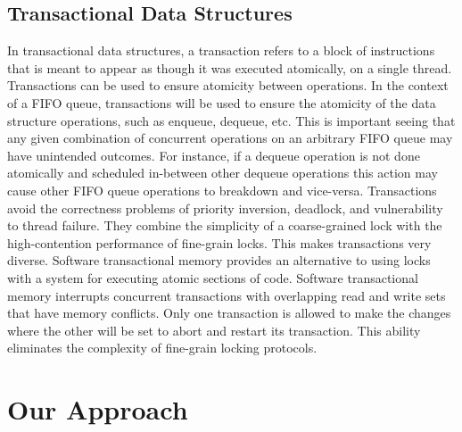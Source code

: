 \documentclass[a4paper, 10pt, conference]{ieeeconf}      %
\begin{document}
\subsection{Transactional Data Structures}
In transactional data structures, a transaction refers to a block of instructions that is meant to appear as though it was executed atomically, on a single thread. Transactions can be used to ensure atomicity between operations. In the context of a FIFO queue, transactions will be used to ensure the atomicity of the data structure operations, such as enqueue, dequeue, etc. This is important seeing that any given combination of concurrent operations on an arbitrary FIFO queue may have unintended outcomes. For instance, if a dequeue operation is not done atomically and scheduled in-between other dequeue operations this action may cause other FIFO queue operations to breakdown and vice-versa. Transactions avoid the correctness problems of priority inversion, deadlock, and vulnerability to thread failure. They combine the simplicity of a coarse-grained lock with the high-contention performance of fine-grain locks. This makes transactions very diverse.
Software transactional memory provides an alternative to using locks with a system for executing atomic sections of code. Software transactional memory interrupts concurrent transactions with overlapping read and write sets that have memory conflicts. Only one transaction is allowed to make the changes where the other will be set to abort and restart its transaction. This ability eliminates the complexity of fine-grain locking protocols. \cite{WEBSITE:1}

\section{Our Approach}
\end{document}
